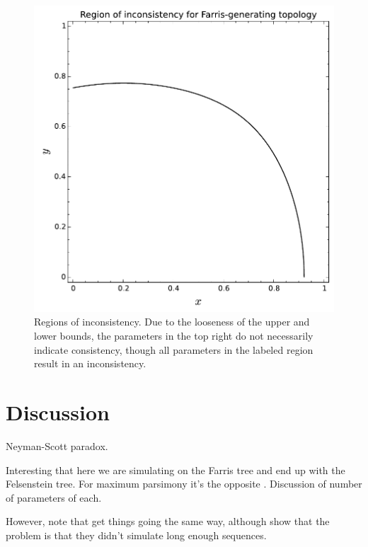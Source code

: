\documentclass[a4paper]{article}
\begin{document}
\begin{figure}
\centering
\includegraphics[width=.9\textwidth]{analytic-inconsistency}
\caption{
    Regions of inconsistency.
    Due to the looseness of the upper and lower bounds, the parameters in the top right do not necessarily indicate consistency, though all parameters in the labeled region result in an inconsistency.
}
\label{fig:inconsistency-farris}
\end{figure}

\section{Discussion}

Neyman-Scott paradox.

Interesting that here we are simulating on the Farris tree and end up with the Felsenstein tree.
For maximum parsimony it's the opposite \cite{Felsenstein1978-rr}.
Discussion of number of parameters of each.

However, note that \cite{Siddall1998-hq} get things going the same way, although \cite{Swofford2001-hr} show that the problem is that they didn't simulate long enough sequences.





\newpage


\end{document}
